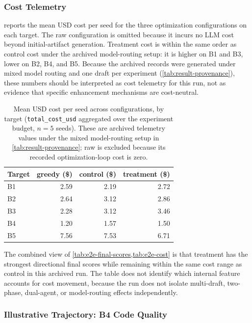 \subsubsection{Cost Telemetry}
\label{sec:end-to-end-cost}

 reports the mean USD cost per seed for the three optimization configurations on each target.
The raw configuration is omitted because it incurs no LLM cost beyond initial-artifact generation.
Treatment cost is within the same order as control cost under the archived model-routing setup: it is higher on B1 and B3, lower on B2, B4, and B5.
Because the archived records were generated under mixed model routing and one draft per experiment (\cref{tab:result-provenance}), these numbers should be interpreted as cost telemetry for this run, not as evidence that specific enhancement mechanisms are cost-neutral.

\begin{table}[t]
  \centering
  \caption{Mean USD cost per seed across configurations, by target (\texttt{total\_cost\_usd} aggregated over the experiment budget, $n = 5$ seeds). These are archived telemetry values under the mixed model-routing setup in \cref{tab:result-provenance}; raw is excluded because its recorded optimization-loop cost is zero.}
  \label{tab:e2e-cost}
  \small
  \begin{tabular}{@{}lrrr@{}}
    \toprule
    Target & greedy (\$) & control (\$) & treatment (\$) \\
    \midrule
    B1 & 2.59 & 2.19 & 2.72 \\
    B2 & 2.64 & 3.12 & 2.86 \\
    B3 & 2.28 & 3.12 & 3.46 \\
    B4 & 1.20 & 1.57 & 1.50 \\
    B5 & 7.56 & 7.53 & 6.71 \\
    \bottomrule
  \end{tabular}
\end{table}

The combined view of \cref{tab:e2e-final-scores,tab:e2e-cost} is that treatment has the strongest directional final scores while remaining within the same cost range as control in this archived run.
The table does not identify which internal feature accounts for cost movement, because the run does not isolate multi-draft, two-phase, dual-agent, or model-routing effects independently.

\subsubsection{Illustrative Trajectory: B4 Code Quality}
\label{sec:end-to-end-illustrative}


